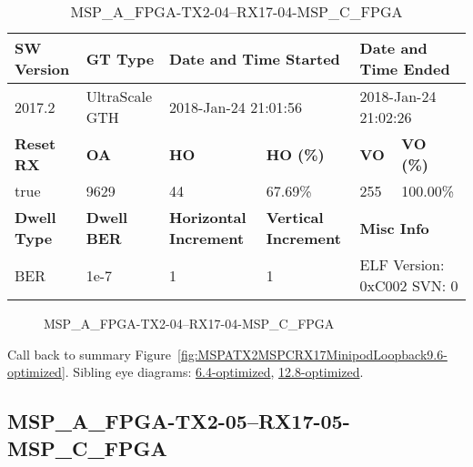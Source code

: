 \begin{table}[h]
\centering
\caption{MSP\_A\_FPGA-TX2-04--RX17-04-MSP\_C\_FPGA}
\label{tab:MSPAFPGATX204RX1704MSPCFPGA9.6-optimized}
\begin{tabular}{@{}|l|l|l|l|l|l|@{}}
\toprule
\textbf{SW Version}                & \textbf{GT Type}   & \multicolumn{2}{l|}{\textbf{Date and Time Started}}            & \multicolumn{2}{l|}{\textbf{Date and Time Ended}}        \\ \midrule
2017.2                       & UltraScale GTH          & \multicolumn{2}{l|}{2018-Jan-24 21:01:56}                   & \multicolumn{2}{l|}{2018-Jan-24 21:02:26}               \\ \midrule
\textbf{Reset RX}                  & \textbf{OA} & \textbf{HO}   & \textbf{HO (\%)} & \textbf{VO} & \textbf{VO (\%)} \\ \midrule
true & 9629        & 44          & 67.69\%        & 255        & 100.00\%       \\ \midrule
\textbf{Dwell Type}                & \textbf{Dwell BER} & \textbf{Horizontal Increment} & \textbf{Vertical Increment}    & \multicolumn{2}{l|}{\textbf{Misc Info}}                  \\ \midrule
BER                            & 1e-7        & 1        & 1           & \multicolumn{2}{l|}{ELF Version: 0xC002 SVN: 0}                         \\ \bottomrule
\end{tabular}
\end{table}

\begin{figure}[h]
\caption{MSP\_A\_FPGA-TX2-04--RX17-04-MSP\_C\_FPGA} \label{fig:MSPAFPGATX204RX1704MSPCFPGA9.6-optimized}
\end{figure}

Call back to summary Figure~\ref{fig:MSPATX2MSPCRX17MinipodLoopback9.6-optimized}.
Sibling eye diagrams: \hyperref[sec:MSPAFPGATX204RX1704MSPCFPGA6.4-optimized]{6.4-optimized}, \hyperref[sec:MSPAFPGATX204RX1704MSPCFPGA12.8-optimized]{12.8-optimized}.

\clearpage
\newpage


\subsection{MSP\_A\_FPGA-TX2-05--RX17-05-MSP\_C\_FPGA}\label{sec:MSPAFPGATX205RX1705MSPCFPGA9.6-optimized}

